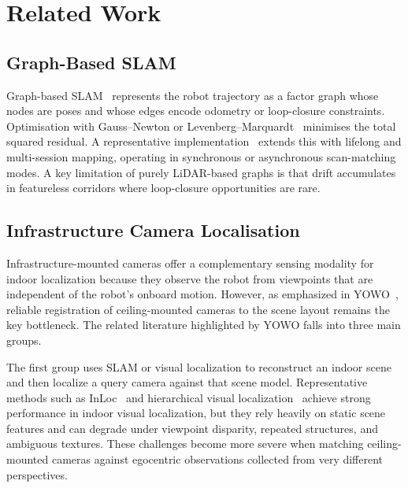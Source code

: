 \section{Related Work}
\label{sec:related_work}


\subsection{Graph-Based SLAM}

Graph-based SLAM~\cite{grisetti2010tutorial} represents the robot trajectory
as a factor graph whose nodes are poses and whose edges encode odometry or
loop-closure constraints.
Optimisation with Gauss–Newton or Levenberg–Marquardt~\cite{ceres-solver}
minimises the total squared residual.
A representative implementation~\cite{macenski2021slam} extends this
with lifelong and multi-session mapping, operating in synchronous or
asynchronous scan-matching modes.
A key limitation of purely LiDAR-based graphs is that drift accumulates in
featureless corridors where loop-closure opportunities are rare.

\subsection{Infrastructure Camera Localisation}

Infrastructure-mounted cameras offer a complementary sensing modality for
indoor localization because they observe the robot from viewpoints that are
independent of the robot's onboard motion.
However, as emphasized in YOWO~\cite{yang2025yowo}, reliable registration of
ceiling-mounted cameras to the scene layout remains the key bottleneck.
The related literature highlighted by YOWO falls into three main groups.

The first group uses SLAM or visual localization to reconstruct an indoor scene
and then localize a query camera against that scene model.
Representative methods such as InLoc~\cite{taira2018inloc} and hierarchical
visual localization~\cite{sarlin2019coarse} achieve strong performance in
indoor visual localization, but they rely heavily on static scene features and
can degrade under viewpoint disparity, repeated structures, and ambiguous
textures.
These challenges become more severe when matching ceiling-mounted cameras
against egocentric observations collected from very different perspectives.

